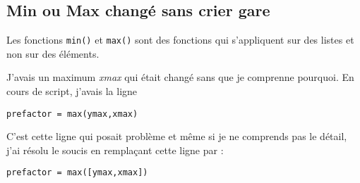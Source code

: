 \documentclass[a4paper,twoside]{article}
\begin{document}
\subsection{Min ou Max changé sans crier gare}
Les fonctions \texttt{min()} et \texttt{max()} sont des fonctions qui s'appliquent sur des listes et non sur des éléments.

J'avais un maximum \emph{xmax} qui était changé sans que je comprenne pourquoi. En cours de script, j'avais la ligne
\begin{lstlisting}[language=IDL]
prefactor = max(ymax,xmax)
\end{lstlisting}

C'est cette ligne qui posait problème et même si je ne comprends pas le détail, j'ai résolu le soucis en remplaçant cette ligne par :
\begin{lstlisting}[language=IDL]
prefactor = max([ymax,xmax])
\end{lstlisting}
\end{document}
